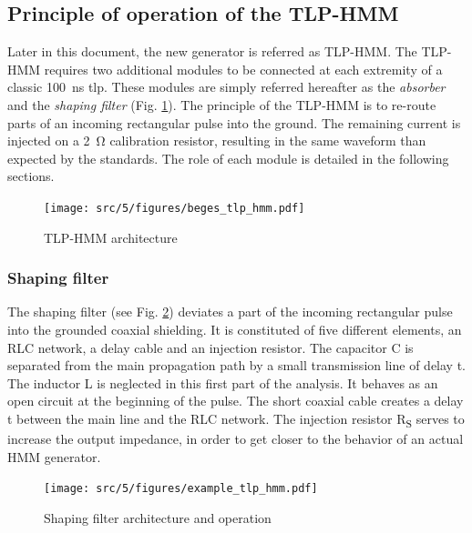 \subsection{Principle of operation of the TLP-HMM}

Later in this document, the new generator is referred as TLP-HMM.
The TLP-HMM requires two additional modules to be connected at each extremity of a classic \SI{100}{\nano\second} \gls{tlp}.
These modules are simply referred hereafter as the \textit{absorber} and the \textit{shaping filter} (Fig. \ref{fig:tlp_hmm_architecture}).
The principle of the TLP-HMM is to re-route parts of an incoming rectangular pulse into the ground.
The remaining current is injected on a \SI{2}{\ohm} calibration resistor, resulting in the same waveform than expected by the standards.
The role of each module is detailed in the following sections.

\begin{figure}[!h]
  \centering
  \texttt{[image: src/5/figures/beges\_tlp\_hmm.pdf]}
  \caption{TLP-HMM architecture}
  \label{fig:tlp_hmm_architecture}
\end{figure}

\subsubsection{Shaping filter}

The shaping filter (see Fig. \ref{fig:shaping_filter_example}) deviates a part of the incoming rectangular pulse into the grounded coaxial shielding.
It is constituted of five different elements, an RLC network, a delay cable and an injection resistor.
The capacitor C is separated from the main propagation path by a small transmission line of delay \textDelta{}t.
The inductor L is neglected in this first part of the analysis.
It behaves as an open circuit at the beginning of the pulse.
The short coaxial cable creates a delay \textDelta{}t between the main line and the RLC network.
The injection resistor R\textsubscript{S} serves to increase the output impedance, in order to get closer to the behavior of an actual HMM generator.

\begin{figure}[!h]
  \centering
  \texttt{[image: src/5/figures/example\_tlp\_hmm.pdf]}
  \caption{Shaping filter architecture and operation}
  \label{fig:shaping_filter_example}
\end{figure}

